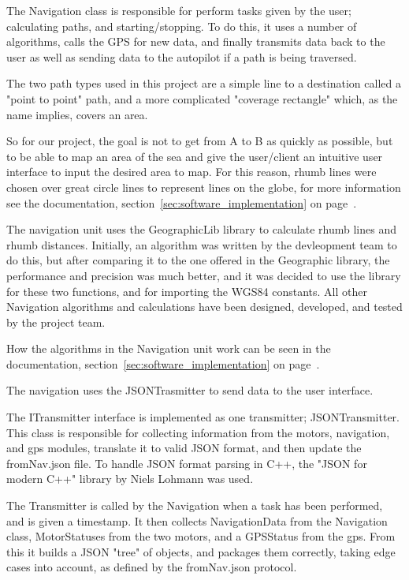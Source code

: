 The Navigation class is responsible for perform tasks given by the user; calculating paths, and starting/stopping. To do this, it uses a number of algorithms, calls the GPS for new data, and finally transmits data back to the user as well as sending data to the autopilot if a path is being traversed.

The two path types used in this project are a simple line to a destination called a "point to point" path, and a more complicated "coverage rectangle" which, as the name implies, covers an area.

So for our project, the goal is not to get from A to B as quickly as possible, but to be able to map an area of the sea and give the user/client an intuitive user interface to input the desired area to map. For this reason, rhumb lines were chosen over great circle lines to represent lines on the globe, for more information see the documentation, section~\ref{sec:software_implementation} on page~\pageref{sec:software_implementation}.

The navigation unit uses the GeographicLib library to calculate rhumb lines and rhumb distances. Initially, an algorithm was written by the devleopment team to do this, but after comparing it to the one offered in the Geographic library, the performance and precision was much better, and it was decided to use the library for these two functions, and for importing the WGS84 constants. All other Navigation algorithms and calculations have been designed, developed, and tested by the project team.

How the algorithms in the Navigation unit work can be seen in the documentation, section~\ref{sec:software_implementation} on page~\pageref{sec:software_implementation}.

The navigation uses the JSONTrasmitter to send data to the user interface.

The ITransmitter interface is implemented as one transmitter; JSONTransmitter. This class is responsible for collecting information from the motors, navigation, and gps modules, translate it to valid JSON format, and then update the fromNav.json file. To handle JSON format parsing in C++, the "JSON for modern C++" library by Niels Lohmann was used\cite{json}. 

The Transmitter is called by the Navigation when a task has been performed, and is given a timestamp. It then collects NavigationData from the Navigation class, MotorStatuses from the two motors, and a GPSStatus from the gps. From this it builds a JSON "tree" of objects, and packages them correctly, taking edge cases into account, as defined by the fromNav.json protocol. 

